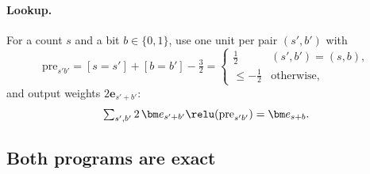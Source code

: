 \paragraph{Lookup.} For a count $s$ and a bit $b\in\{0,1\}$, use one unit per pair $(s',b')$ with
\[
 \mathrm{pre}_{s'b'}=[s=s']+[b=b']-\tfrac{3}{2}=\begin{cases}\tfrac{1}{2}&(s',b')=(s,b),\\\le-\tfrac{1}{2}&\text{otherwise},\end{cases}
\]
and output weights $2\bm e_{s'+b'}$:
\begin{equation}
 \textstyle\sum_{s',b'}2\,\bm e_{s'+b'}\relu(\mathrm{pre}_{s'b'})=\bm e_{s+b}.
 \label{eq:lookup}
\end{equation}

\subsection{Both programs are exact}
\label{app:exact}

